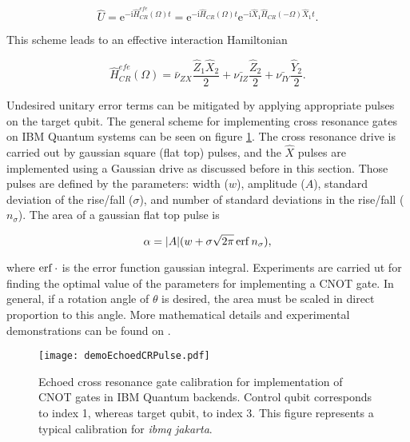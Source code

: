     \begin{equation}
      \hat{U} = \mathrm{e}^{-\mathrm{i}\hat{H}_{CR}^{efe}(\Omega)t} = \mathrm{e}^{-\mathrm{i}\hat{H}_{CR}(\Omega)t} \mathrm{e}^{-\mathrm{i}\hat{X}_1\hat{H}_{CR}(-\Omega)\hat{X}_1t}.
      \label{eq:pulseCREvolution}
    \end{equation}

    This scheme leads to an effective interaction Hamiltonian \cite{DuplicatedRXZPulse}

    \begin{equation}
      \hat{H}_{CR}^{efe}(\Omega) = \bar{\nu}_{ZX} \frac{\hat{Z}_1\hat{X}_2}{2} + \bar{\nu_{IZ}} \frac{\hat{Z}_2}{2} + \bar{\nu_{IY}} \frac{\hat{Y}_2}{2}.
      \label{eq:effectiveHamiltonian}
    \end{equation}

    Undesired unitary error terms can be mitigated by applying appropriate pulses on the target qubit. The general scheme for implementing cross resonance gates on IBM Quantum systems can be seen on figure \ref{fig:echoedPulseQiskit}. The cross resonance drive is carried out by gaussian square (flat top) pulses, and the $\hat{X}$ pulses are implemented using a Gaussian drive as discussed before in this section. Those pulses are defined by the parameters: width ($w$), amplitude ($A$), standard deviation of the rise/fall ($\sigma$), and number of standard deviations in the rise/fall ($n_\sigma$). The area of a gaussian flat top pulse is

    \begin{equation}
      \alpha = |A|(w + \sigma\sqrt{2\pi}\erf{n_\sigma}),
      \label{eq:StandardPulse}
    \end{equation}
    
    \noindent where $\erf{\cdot}$ is the error function gaussian integral. Experiments are carried ut for finding the optimal value of the parameters for implementing a CNOT gate. In general, if a rotation angle of $\theta$ is desired, the area must be scaled in direct proportion to this angle. More mathematical details and experimental demonstrations can be found on \cite{DuplicatedRXZPulse, 2016RZXCalibration, MajoranaSimulation}.

    \begin{figure}
      \centering
      \texttt{[image: demoEchoedCRPulse.pdf]}
      \caption{Echoed cross resonance gate calibration for implementation of CNOT gates in IBM Quantum backends. Control qubit corresponds to index 1, whereas target qubit, to index 3. This figure represents a typical calibration for \textit{ibmq jakarta}.}
      \label{fig:echoedPulseQiskit}
    \end{figure}

